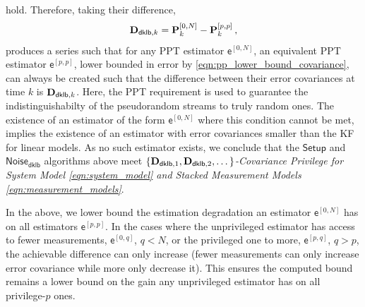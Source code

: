 \documentclass[conference]{IEEEtran}
\theoremstyle{definition}
\theoremstyle{remark}
\begin{document}
hold. Therefore, taking their difference,
\begin{equation}\label{eqn:unpriv_priv_dklb_difference_series}
  \mat{D}_{\mathsf{dklb},k} = \mat{P}_k^{[0,N]} - \mat{P}_k^{[p,p]}\,,
\end{equation}
produces a series such that for any PPT estimator $\mathsf{e}^{[0,N]}$, an equivalent PPT estimator $\mathsf{e}^{[p,p]}$, lower bounded in error by \eqref{eqn:pp_lower_bound_covariance}, can always be created such that the difference between their error covariances at time $k$ is ${{\mathbf{D}}}_{\mathsf{dklb},k}$. Here, the PPT requirement is used to guarantee the indistinguishabilty of the pseudorandom streams to truly random ones. The existence of an estimator of the form $\mathsf{e}^{[0,N]}$ where this condition cannot be met, implies the existence of an estimator with error covariances smaller than the KF for linear models. As no such estimator exists, we conclude that the $\mathsf{Setup}$ and $\mathsf{Noise_{\mathsf{dklb}}}$ algorithms above meet \textit{$\{{{\mathbf{D}}}_{\mathsf{dklb},1},{{\mathbf{D}}}_{\mathsf{dklb},2},\dots\}$-Covariance Privilege for System Model \eqref{eqn:system_model} and Stacked Measurement Models \eqref{eqn:measurement_models}}.

In the above, we lower bound the estimation degradation an estimator $\mathsf{e}^{[0,N]}$ has on all estimators $\mathsf{e}^{[p,p]}$. In the cases where the unprivileged estimator has access to fewer measurements, $\mathsf{e}^{[0,q]}$, $q<N$, or the privileged one to more, $\mathsf{e}^{[p,q]}$, $q>p$, the achievable difference can only increase (fewer measurements can only increase error covariance while more only decrease it). This ensures the computed bound remains a lower bound on the gain any unprivileged estimator has on all privilege-$p$ ones.

% 
% 
\end{document}
